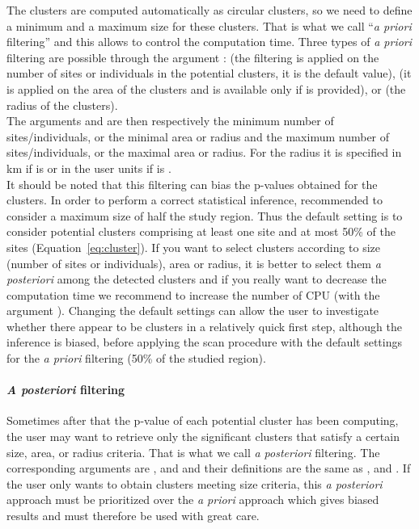The clusters are computed automatically as circular clusters, so we need to define a minimum and a maximum size for these clusters. That is what we call ``\textit{a priori} filtering'' and this allows to control the computation time. Three types of \textit{a priori} filtering are possible through the argument :  (the filtering is applied on the number of sites or individuals in the potential clusters, it is the default value),  (it is applied on the area of the clusters and is available only if  is provided), or  (the radius of the clusters). \\
The arguments  and  are then respectively the minimum number of sites/individuals, or the minimal area or radius and the maximum number of sites/individuals, or the maximal area or radius. For the radius it is specified in km if  is  or in the user units if  is . \\
It should be noted that this filtering can bias the p-values obtained for the clusters. In order to perform a correct statistical inference, \citet{spatialdisease} recommended to consider a maximum size of half the study region. 
Thus the default setting is to consider potential clusters comprising at least one site and at most 50\% of the sites (Equation~\ref{eq:cluster}).
If you want to select clusters according to size (number of sites or individuals), area or radius, it is better to select them \textit{a posteriori} among the detected clusters and if you really want to decrease the computation time we recommend to increase the number of CPU (with the argument ).
Changing the default settings can allow the user to investigate whether there appear to be clusters in a relatively quick first step, although the inference is biased, before applying the scan procedure with the default settings for the \textit{a priori} filtering (50\% of the studied region).


\paragraph{\textit{A posteriori} filtering}

Sometimes after that the p-value of each potential cluster has been computing, the user may want to retrieve only the significant clusters that satisfy a certain size, area, or radius criteria. That is what we call \textit{a posteriori} filtering. 
The corresponding arguments are ,  and  and their definitions are the same as ,  and . If the user only wants to obtain clusters meeting size criteria, this \textit{a posteriori} approach must be prioritized over the \textit{a priori} approach which gives biased results and must therefore be used with great care. 

